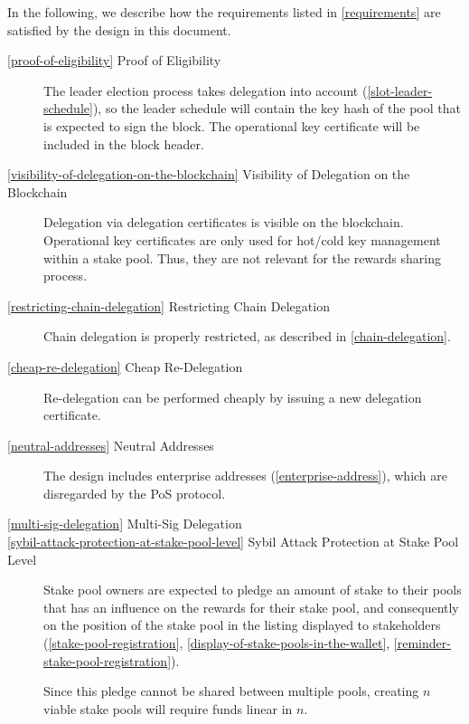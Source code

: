 \documentclass[11pt,a4paper]{article}
\begin{document}
In the following, we describe how the requirements listed in
\cref{requirements} are satisfied by the design in this document.

\begin{description}

\item[\cref{proof-of-eligibility} Proof of Eligibility] The leader election
  process takes delegation into account (\cref{slot-leader-schedule}), so the
  leader schedule will contain the key hash of the pool that is expected to sign
  the block. The operational key certificate will be included in the block
  header.

\item[\cref{visibility-of-delegation-on-the-blockchain} Visibility of Delegation
  on the Blockchain] Delegation via delegation certificates is visible on the
  blockchain. Operational key certificates are only used for hot/cold key
  management within a stake pool. Thus, they are not relevant for the rewards
  sharing process.

\item[\cref{restricting-chain-delegation} Restricting Chain
  Delegation] Chain delegation is properly restricted, as described in
  \cref{chain-delegation}.

\item[\cref{cheap-re-delegation} Cheap Re-Delegation] Re-delegation can
  be performed cheaply by issuing a new delegation certificate.

\item[\cref{neutral-addresses} Neutral Addresses] The design includes
  enterprise addresses (\cref{enterprise-address}), which are
  disregarded by the PoS protocol.

\item[\cref{multi-sig-delegation} Multi-Sig Delegation] 

\item[\cref{sybil-attack-protection-at-stake-pool-level} Sybil Attack
  Protection at Stake Pool Level] Stake pool owners are expected to
  pledge an amount of stake to their pools that has an influence on
  the rewards for their stake pool, and consequently on the
  position of the stake pool in the listing displayed to stakeholders
  (\cref{stake-pool-registration},
  \cref{display-of-stake-pools-in-the-wallet},
  \cref{reminder-stake-pool-registration}).

  Since this pledge cannot be shared between multiple pools, creating
  $n$ viable stake pools will require funds linear in $n$.


\end{description}
\end{document}
